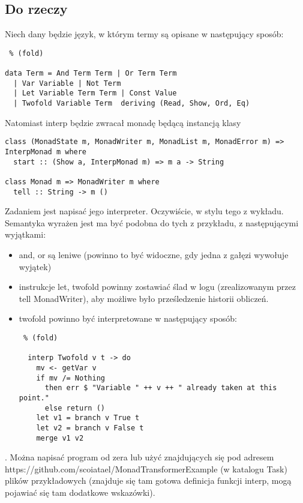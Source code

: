 \documentclass[11pt,wide]{mwart}
\begin{document}
\subsection{Do rzeczy}
Niech dany będzie język, w którym termy są opisane w następujący sposób:\begin{lstlisting} % (fold)

data Term = And Term Term | Or Term Term 
  | Var Variable | Not Term 
  | Let Variable Term Term | Const Value
  | Twofold Variable Term  deriving (Read, Show, Ord, Eq)
  \end{lstlisting}
  Natomiast interp będzie zwracał monadę będącą instancją klasy
  \begin{lstlisting}
class (MonadState m, MonadWriter m, MonadList m, MonadError m) => InterpMonad m where
  start :: (Show a, InterpMonad m) => m a -> String

class Monad m => MonadWriter m where
  tell :: String -> m ()

\end{lstlisting}Zadaniem jest napisać jego interpreter. Oczywiście, w stylu tego z wykładu. Semantyka wyrażen jest ma być podobna do tych z przykładu, z następującymi wyjątkami:\begin{itemize}
  \item and, or są leniwe (powinno to być widoczne, gdy jedna z gałęzi wywołuje wyjątek)
  \item instrukcje let, twofold powinny zostawiać ślad w logu (zrealizowanym przez tell MonadWriter), aby możliwe było prześledzenie historii obliczeń.
  \item twofold powinno być interpretowane w następujący sposób:\begin{lstlisting} % (fold)

  interp Twofold v t -> do
    mv <- getVar v
    if mv /= Nothing
      then err $ "Variable " ++ v ++ " already taken at this point."
      else return ()
    let v1 = branch v True t
    let v2 = branch v False t
    merge v1 v2

  \end{lstlisting}
\end{itemize}.
Można napisać program od zera lub użyć znajdujących się pod adresem https://github.com/scoiatael/MonadTransformerExample (w katalogu Task) plików przykładowych (znajduje się tam gotowa definicja funkcji interp, mogą pojawiać się tam dodatkowe wskazówki).
\end{document}
